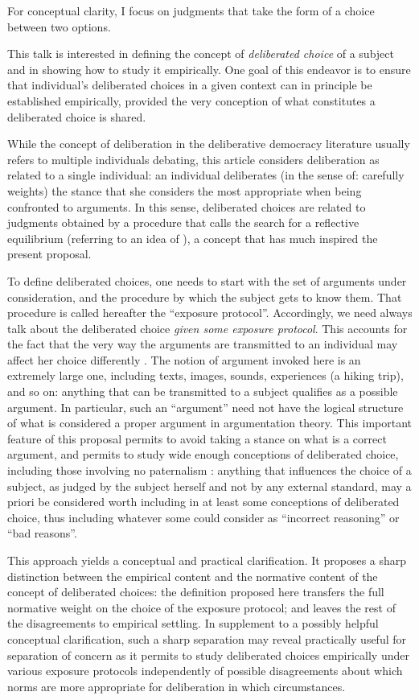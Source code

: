 \documentclass[version=last, pagesize, twoside=off, bibliography=totoc, DIV=calc, fontsize=12pt, a4paper, french, english]{scrartcl}
\begin{document}
For conceptual clarity, I focus on judgments that take the form of a choice between two options.

This talk is interested in defining the concept of \emph{deliberated choice} of a subject and in showing how to study it empirically.
One goal of this endeavor is to ensure that individual’s deliberated choices in a given context can in principle be established empirically, provided the very conception of what constitutes a deliberated choice is shared.

While the concept of deliberation in the deliberative democracy literature usually refers to multiple individuals debating, this article considers deliberation as related to a single individual: an individual deliberates (in the sense of: carefully weights) the stance that she considers the most appropriate when being confronted to arguments. In this sense, deliberated choices are related to judgments obtained by a procedure that \citet{rawls_theory_1999} calls the search for a reflective equilibrium (referring to an idea of \citet{goodman_fact_1983}), a concept that has much inspired the present proposal.

To define deliberated choices, one needs to start with the set of arguments under consideration, and the procedure by which the subject gets to know them. That procedure is called hereafter the “exposure protocol”.
Accordingly, we need always talk about the deliberated choice \emph{given some exposure protocol}. 
This accounts for the fact that the very way the arguments are transmitted to an individual may affect her choice differently \citep{railton_facts_2003}. 
The notion of argument invoked here is an extremely large one, including texts, images, sounds, experiences (a hiking trip), and so on: anything that can be transmitted to a subject qualifies as a possible argument. In particular, such an “argument” need not have the logical structure of what is considered a proper argument in argumentation theory. This important feature of this proposal permits to avoid taking a stance on what is a correct argument, and permits to study wide enough conceptions of deliberated choice, including those involving no paternalism \citep{cailloux_formal_2020}: anything that influences the choice of a subject, as judged by the subject herself and not by any external standard, may a priori be considered worth including in at least some conceptions of deliberated choice, thus including whatever some could consider as “incorrect reasoning” or “bad reasons”.

This approach yields a conceptual and practical clarification. It proposes a sharp distinction between the empirical content and the normative content of the concept of deliberated choices: the definition proposed here transfers the full normative weight on the choice of the exposure protocol; and leaves the rest of the disagreements to empirical settling. 
In supplement to a possibly helpful conceptual clarification, such a sharp separation may reveal practically useful for separation of concern as it permits to study deliberated choices empirically under various exposure protocols independently of possible disagreements about which norms are more appropriate for deliberation in which circumstances.
\end{document}
